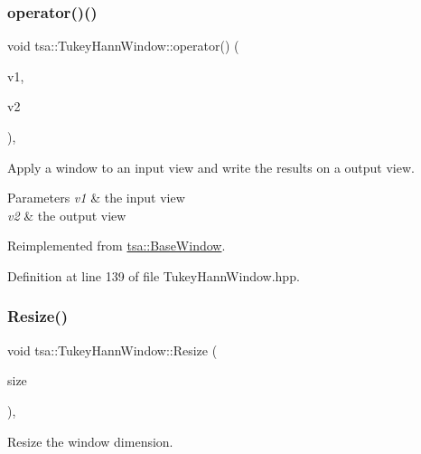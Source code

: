 \subsubsection{\texorpdfstring{operator()()}{operator()()}\hspace{0.1cm}{\footnotesize\ttfamily [2/2]}}
{\footnotesize\ttfamily void tsa\+::\+Tukey\+Hann\+Window\+::operator() (\begin{DoxyParamCaption}\item[{\hyperlink{namespacetsa_ac599574bcc094eda25613724b8f3ca9e}{Seq\+View\+Double} \&}]{v1,  }\item[{\hyperlink{namespacetsa_ac599574bcc094eda25613724b8f3ca9e}{Seq\+View\+Double} \&}]{v2 }\end{DoxyParamCaption})\hspace{0.3cm}{\ttfamily [inline]}, {\ttfamily [virtual]}}

Apply a window to an input view and write the results on a output view.


\begin{DoxyParams}{Parameters}
{\em v1} & the input view \\
\hline
{\em v2} & the output view \\
\hline
\end{DoxyParams}


Reimplemented from \hyperlink{classtsa_1_1_base_window_afda50daa943527e09792b06e5ba69bcb}{tsa\+::\+Base\+Window}.



Definition at line 139 of file Tukey\+Hann\+Window.\+hpp.

\mbox{\label{classtsa_1_1_tukey_hann_window_a253c1786cef6ec7b5e7ef700f4238496}} 
\subsubsection{\texorpdfstring{Resize()}{Resize()}}
{\footnotesize\ttfamily void tsa\+::\+Tukey\+Hann\+Window\+::\+Resize (\begin{DoxyParamCaption}\item[{unsigned int}]{size }\end{DoxyParamCaption})\hspace{0.3cm}{\ttfamily [inline]}, {\ttfamily [virtual]}}

Resize the window dimension.


